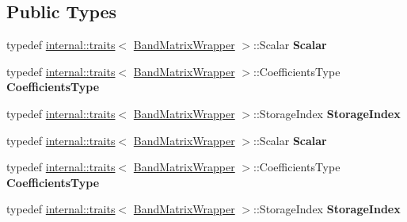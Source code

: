 \subsection*{Public Types}
\begin{DoxyCompactItemize}
\item 
\mbox{\label{class_eigen_1_1internal_1_1_band_matrix_wrapper_a4d9b3b75046e2d298f72cae7c9929a3f}} 
typedef \hyperlink{struct_eigen_1_1internal_1_1traits}{internal\+::traits}$<$ \hyperlink{class_eigen_1_1internal_1_1_band_matrix_wrapper}{Band\+Matrix\+Wrapper} $>$\+::Scalar {\bfseries Scalar}
\item 
\mbox{\label{class_eigen_1_1internal_1_1_band_matrix_wrapper_af2619600a9ac7189c920700acec2ed18}} 
typedef \hyperlink{struct_eigen_1_1internal_1_1traits}{internal\+::traits}$<$ \hyperlink{class_eigen_1_1internal_1_1_band_matrix_wrapper}{Band\+Matrix\+Wrapper} $>$\+::Coefficients\+Type {\bfseries Coefficients\+Type}
\item 
\mbox{\label{class_eigen_1_1internal_1_1_band_matrix_wrapper_a34e63430ed81b44a49dd339987e8ced6}} 
typedef \hyperlink{struct_eigen_1_1internal_1_1traits}{internal\+::traits}$<$ \hyperlink{class_eigen_1_1internal_1_1_band_matrix_wrapper}{Band\+Matrix\+Wrapper} $>$\+::Storage\+Index {\bfseries Storage\+Index}
\item 
\mbox{\label{class_eigen_1_1internal_1_1_band_matrix_wrapper_a4d9b3b75046e2d298f72cae7c9929a3f}} 
typedef \hyperlink{struct_eigen_1_1internal_1_1traits}{internal\+::traits}$<$ \hyperlink{class_eigen_1_1internal_1_1_band_matrix_wrapper}{Band\+Matrix\+Wrapper} $>$\+::Scalar {\bfseries Scalar}
\item 
\mbox{\label{class_eigen_1_1internal_1_1_band_matrix_wrapper_af2619600a9ac7189c920700acec2ed18}} 
typedef \hyperlink{struct_eigen_1_1internal_1_1traits}{internal\+::traits}$<$ \hyperlink{class_eigen_1_1internal_1_1_band_matrix_wrapper}{Band\+Matrix\+Wrapper} $>$\+::Coefficients\+Type {\bfseries Coefficients\+Type}
\item 
\mbox{\label{class_eigen_1_1internal_1_1_band_matrix_wrapper_a34e63430ed81b44a49dd339987e8ced6}} 
typedef \hyperlink{struct_eigen_1_1internal_1_1traits}{internal\+::traits}$<$ \hyperlink{class_eigen_1_1internal_1_1_band_matrix_wrapper}{Band\+Matrix\+Wrapper} $>$\+::Storage\+Index {\bfseries Storage\+Index}
\end{DoxyCompactItemize}
